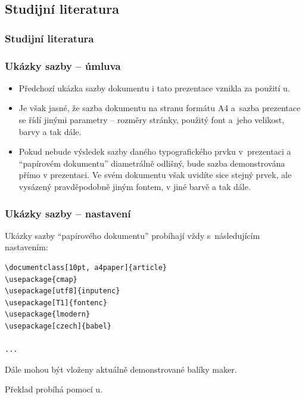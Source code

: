 \subsection{Studijní literatura}
\begin{refsection}
	\nocite{Satrapa2023, Kopka2004, Oetiker2011, Oetiker2018, Kopka1999, Lamport1994, Mittelbach2004, Beran2007, Kocicka2004, Felici2003}
	\begin{frame}[t, allowframebreaks]
		\frametitle{Studijní literatura}
		\printbibliography[heading=none]
	\end{frame}
\end{refsection}


\begin{frame}
	\frametitle{Ukázky sazby -- úmluva}
	\begin{itemize}
		\item Předchozí ukázka sazby dokumentu i tato prezentace vznikla za použití u.
		\item Je však jasné, že sazba dokumentu na stranu formátu A4 a~sazba prezentace se řídí jinými parametry -- rozměry stránky, použitý font a~jeho velikost, barvy a tak dále.
		\item Pokud nebude výsledek sazby daného typografického prvku v~prezentaci a \enquote{papírovém dokumentu} diametrálně odlišný, bude sazba demonstrována přímo v prezentaci. Ve svém dokumentu však uvidíte sice stejný prvek, ale vysázený pravděpodobně jiným fontem, v jiné barvě a tak dále.
	\end{itemize}
\end{frame}


\begin{frame}
	\frametitle{Ukázky sazby -- nastavení}
	Ukázky sazby \enquote{papírového dokumentu} probíhají vždy s~následujícím nastavením:\par
	\begin{BVerbatim}
\documentclass[10pt, a4paper]{article}
\usepackage{cmap}
\usepackage[utf8]{inputenc}
\usepackage[T1]{fontenc}
\usepackage{lmodern}
\usepackage[czech]{babel}

...

	\end{BVerbatim}
	\par
	 Dále mohou být vloženy aktuálně demonstrované balíky maker.\par
	 Překlad probíhá pomocí u.
\end{frame}

\endinput

